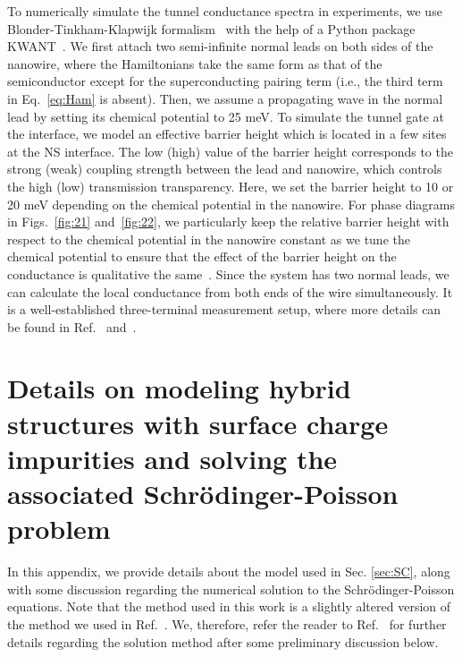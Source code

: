 \documentclass[aps,prmaterials,twocolumn,superscriptaddress,longbibliography]{revtex4-2}
\begin{document}
To numerically simulate the tunnel conductance spectra in experiments, we use Blonder-Tinkham-Klapwijk formalism~\cite{blonder1982transition,datta1995electronic,anantram1996current} with the help of a Python package KWANT~\cite{groth2014kwant}. We first attach two semi-infinite normal leads on both sides of the nanowire, where the Hamiltonians take the same form as that of the semiconductor except for the superconducting pairing term (i.e., the third term in Eq.~\eqref{eq:Ham} is absent). Then, we assume a propagating wave in the normal lead by setting its chemical potential to 25 meV. 
To simulate the tunnel gate at the interface, we model an effective barrier height which is located in a few sites at the NS interface. The low (high) value of the barrier height corresponds to the strong (weak) coupling strength between the lead and nanowire, which controls the high (low) transmission transparency. Here, we set the barrier height to 10 or 20 meV depending on the chemical potential in the nanowire. For phase diagrams in Figs.~\ref{fig:21} and~\ref{fig:22}, we particularly keep the relative barrier height with respect to the chemical potential in the nanowire constant as we tune the chemical potential to ensure that the effect of the barrier height on the conductance is qualitative the same~\cite{setiawan2017electron}. Since the system has two normal leads, we can calculate the local conductance from both ends of the wire simultaneously. It is a well-established three-terminal measurement setup, where more details can be found in Ref.~ and~. 

\section{Details on modeling hybrid structures with surface charge impurities and solving the associated Schr{\"o}dinger-Poisson problem} \label{app:E}
In this appendix, we provide details about the model used in Sec. \ref{sec:SC}, along with some discussion regarding the numerical solution to the Schr{\"o}dinger-Poisson equations. Note that the method used in this work is a slightly altered version of the method we used in Ref.~. We, therefore, refer the reader to Ref.~ for further details regarding the solution method after some preliminary discussion below.
\end{document}
